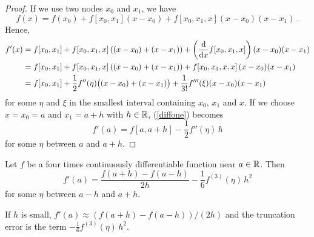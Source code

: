 \begin{proof}
If we use two nodes $x_0$ and $x_1$, we have
\[
f(x) = f(x_0) + f[x_0,x_1](x-x_0) + f[x_0,x_1,x](x-x_0)(x-x_1) \ .
\]
Hence,
\begin{align}
f'(x) &= f[x_0,x_1] + f[x_0,x_1,x]\left((x-x_0)+(x-x_1)\right)
+ \left( \dfdx{f[x_0,x_1,x]}{x}\right)(x-x_0)(x-x_1) \nonumber \\
&= f[x_0,x_1] + f[x_0,x_1,x]\left((x-x_0)+(x-x_1)\right)
+ f[x_0,x_1,x,x] \,(x-x_0)(x-x_1) \nonumber \\
&= f[x_0,x_1] + \frac{1}{2}f''(\eta)\big((x-x_0)+(x-x_1)\big) +
\frac{1}{3!}f'''(\xi)(x-x_0)(x-x_1) \label{diffone}
\end{align}
for some $\eta$ and $\xi$ in the smallest interval containing $x_0$,
$x_1$ and $x$.  If we choose $x = x_0 = a$ and $x_1= a + h$ with
$h \in \RR$, (\ref{diffone}) becomes
\[
f'(a) = f[a,a+h] - \frac{1}{2}f''(\eta)\,h
\]
for some $\eta$ between $a$ and $a+h$.
\end{proof}

\begin{theorem}
Let $f$ be a four times continuously differentiable function near
$a \in \RR$.  Then
\begin{equation} \label{CDF}
f'(a) = \frac{f(a + h) - f(a - h)}{2h} - \frac{1}{6}f^{(3)}(\eta)\,h^2
\end{equation}
for some $\eta$ between $a-h$ and $a+h$.
\end{theorem}

\begin{rmk}
If $h$ is small, $f'(a) \approx (f(a + h) - f(a - h))/(2h)$ and the 
truncation error is the term $\displaystyle -\frac{1}{6}f^{(3)}(\eta)\,h^2$.
\end{rmk}

